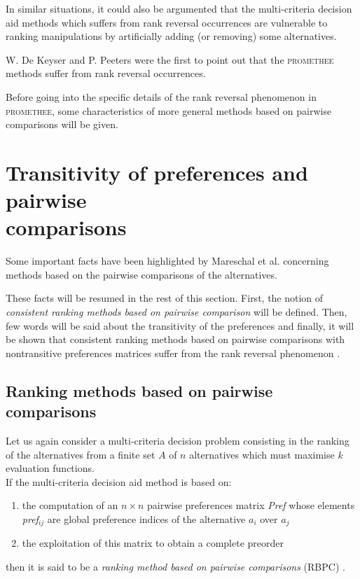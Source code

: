 In similar situations, it could also be argumented that the multi-criteria decision aid methods which suffers from rank reversal occurrences are vulnerable to ranking manipulations by artificially adding (or removing) some alternatives.

W. De Keyser and P. Peeters \cite{de1996note} were the first to point out that the \textsc{promethee} methods suffer from rank reversal occurrences.

Before going into the specific details of the rank reversal phenomenon in \textsc{promethee}, some characteristics of more general methods based on pairwise comparisons will be given.

\section{Transitivity of preferences and pairwise \\ comparisons}
Some important facts have been highlighted by Mareschal et al. \cite{mareschal2008rank} concerning methods based on the pairwise comparisons of the alternatives.

These facts will be resumed in the rest of this section. First, the notion of \textit{consistent ranking methods based on pairwise comparison} will be defined.
Then, few words will be said about the transitivity of the preferences and finally, it will be shown that consistent ranking methods based on pairwise comparisons with nontransitive preferences matrices suffer from the rank reversal phenomenon \cite{mareschal2008rank}.


\subsection{Ranking methods based on pairwise comparisons}
\label{sec:RBPC}
Let us again consider a multi-criteria decision problem consisting in the ranking of the alternatives from a finite set $A$ of $n$ alternatives which must maximise $k$ evaluation functions.\\
\newpage
If the multi-criteria decision aid method is based on:
\begin{enumerate}
    \item the computation of an $n \times n$ pairwise preferences matrix \textit{Pref} whose elements \textit{pref}$_{ij}$ are global preference indices of the alternative $a_i$ over $a_j$
    \item the exploitation of this matrix to obtain a complete preorder
\end{enumerate}
then it is said to be a \textit{ranking method based on pairwise comparisons} (RBPC) \cite{mareschal2008rank}.

